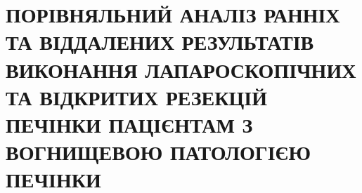 \chapter{ПОРІВНЯЛЬНИЙ АНАЛІЗ РАННІХ ТА ВІД\-ДА\-ЛЕ\-НИХ РЕЗУЛЬТАТІВ ВИКОНАННЯ ЛАПАРО\-СКОПІЧНИХ ТА ВІДКРИТИХ РЕЗЕКЦІЙ ПЕЧІНКИ ПАЦІЄНТАМ З ВОГНИЩЕВОЮ ПАТОЛОГІЄЮ ПЕЧІНКИ}